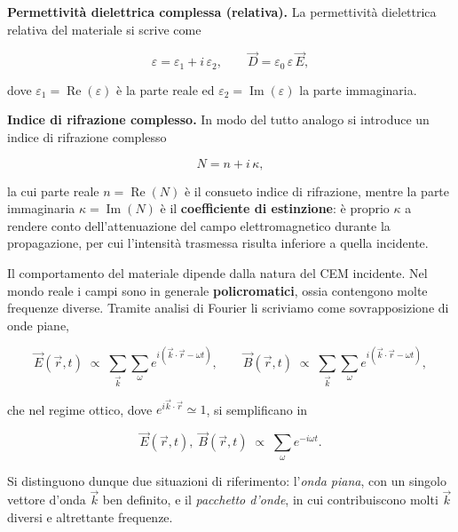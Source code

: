 \textbf{Permettività dielettrica complessa (relativa).} La permettività dielettrica relativa del materiale si scrive come

\begin{equation}
    \varepsilon = \varepsilon_1 + i \, \varepsilon_2, \qquad \vec{D} = \varepsilon_0 \, \varepsilon \, \vec{E},
\end{equation}

dove \( \varepsilon_1 = \operatorname{Re}(\varepsilon) \) è la parte reale ed \( \varepsilon_2 = \operatorname{Im}(\varepsilon) \) la parte immaginaria.

\textbf{Indice di rifrazione complesso.} In modo del tutto analogo si introduce un indice di rifrazione complesso

\begin{equation}
    N = n + i \, \kappa,
\end{equation}

la cui parte reale \( n = \operatorname{Re}(N) \) è il consueto indice di rifrazione, mentre la parte immaginaria \( \kappa = \operatorname{Im}(N) \) è il \textbf{coefficiente di estinzione}: è proprio \( \kappa \) a rendere conto dell'attenuazione del campo elettromagnetico durante la propagazione, per cui l'intensità trasmessa risulta inferiore a quella incidente.

Il comportamento del materiale dipende dalla natura del CEM incidente. Nel mondo reale i campi sono in generale \textbf{policromatici}, ossia contengono molte frequenze diverse. Tramite analisi di Fourier li scriviamo come sovrapposizione di onde piane,

\begin{equation}
    \vec{E}(\vec{r}, t) \;\propto\; \sum_{\vec{k}} \sum_{\omega} e^{i (\vec{k} \cdot \vec{r} - \omega t)}, \qquad
    \vec{B}(\vec{r}, t) \;\propto\; \sum_{\vec{k}} \sum_{\omega} e^{i (\vec{k} \cdot \vec{r} - \omega t)},
\end{equation}

che nel regime ottico, dove \( e^{i \vec{k} \cdot \vec{r}} \simeq 1 \), si semplificano in

\begin{equation}
    \vec{E}(\vec{r}, t), \; \vec{B}(\vec{r}, t) \;\propto\; \sum_{\omega} e^{-i \omega t}.
\end{equation}

Si distinguono dunque due situazioni di riferimento: l'\emph{onda piana}, con un singolo vettore d'onda \( \vec{k} \) ben definito, e il \emph{pacchetto d'onde}, in cui contribuiscono molti \( \vec{k} \) diversi e altrettante frequenze.

